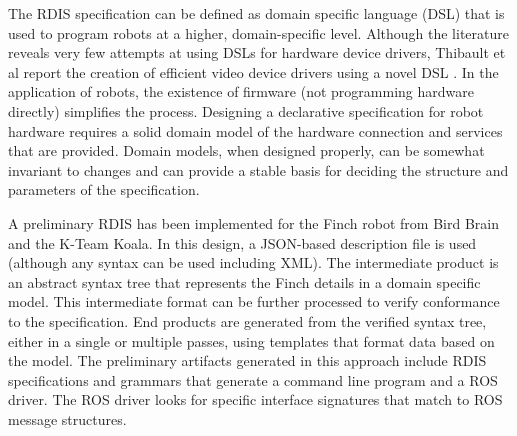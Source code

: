 
The RDIS specification can be defined as domain specific language (DSL) that is used to program robots at a higher, domain-specific level.  Although the literature reveals very few attempts at using DSLs for hardware device drivers, Thibault et al report the creation of efficient video device drivers using a novel DSL \cite{Thibault1999}.  In the application of robots, the existence of firmware (not programming hardware directly) simplifies the process.  Designing a declarative specification for robot hardware requires a solid domain model of the hardware connection and services that are provided.  Domain models, when designed properly, can be somewhat invariant to changes and can provide a stable basis for deciding the structure and parameters of the specification.  %

A preliminary RDIS has been implemented for the Finch robot from Bird Brain and the K-Team Koala\cite{Anderson2012}.  In this design, a JSON-based description file is used (although any syntax can be used including XML).  The intermediate product is an abstract syntax tree that represents the Finch details in a domain specific model.  This intermediate format can be further processed to verify conformance to the specification.  End products are generated from the verified syntax tree, either in a single or multiple passes, using templates that format data based on the model.  The preliminary artifacts generated in this approach   include RDIS specifications and grammars that generate a command line program and a ROS driver.  The ROS driver looks for specific interface signatures that match to ROS message structures.    

